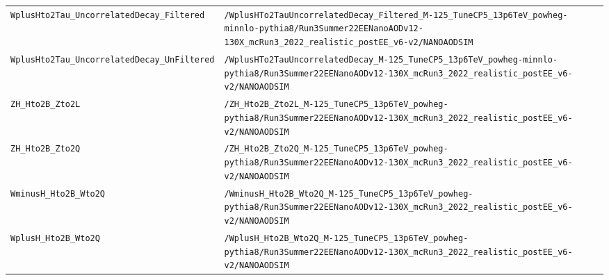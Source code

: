 \begin{longtable}{@{}>{\RaggedRight\arraybackslash}p{} >{\RaggedRight\arraybackslash}p{}@{}}
\texttt{WplusHto2Tau\_\allowbreak{}UncorrelatedDecay\_\allowbreak{}Filtered} & \texttt{/\allowbreak{}WplusHTo2TauUncorrelatedDecay\_\allowbreak{}Filtered\_\allowbreak{}M-\allowbreak{}125\_\allowbreak{}TuneCP5\_\allowbreak{}13p6TeV\_\allowbreak{}powheg-\allowbreak{}minnlo-\allowbreak{}pythia8/\allowbreak{}Run3Summer22EENanoAODv12-\allowbreak{}130X\_\allowbreak{}mcRun3\_\allowbreak{}2022\_\allowbreak{}realistic\_\allowbreak{}postEE\_\allowbreak{}v6-\allowbreak{}v2/\allowbreak{}NANOAODSIM} \\
\addlinespace[2pt]
\texttt{WplusHto2Tau\_\allowbreak{}UncorrelatedDecay\_\allowbreak{}UnFiltered} & \texttt{/\allowbreak{}WplusHTo2TauUncorrelatedDecay\_\allowbreak{}M-\allowbreak{}125\_\allowbreak{}TuneCP5\_\allowbreak{}13p6TeV\_\allowbreak{}powheg-\allowbreak{}minnlo-\allowbreak{}pythia8/\allowbreak{}Run3Summer22EENanoAODv12-\allowbreak{}130X\_\allowbreak{}mcRun3\_\allowbreak{}2022\_\allowbreak{}realistic\_\allowbreak{}postEE\_\allowbreak{}v6-\allowbreak{}v2/\allowbreak{}NANOAODSIM} \\
\addlinespace[2pt]
\texttt{ZH\_\allowbreak{}Hto2B\_\allowbreak{}Zto2L} & \texttt{/\allowbreak{}ZH\_\allowbreak{}Hto2B\_\allowbreak{}Zto2L\_\allowbreak{}M-\allowbreak{}125\_\allowbreak{}TuneCP5\_\allowbreak{}13p6TeV\_\allowbreak{}powheg-\allowbreak{}pythia8/\allowbreak{}Run3Summer22EENanoAODv12-\allowbreak{}130X\_\allowbreak{}mcRun3\_\allowbreak{}2022\_\allowbreak{}realistic\_\allowbreak{}postEE\_\allowbreak{}v6-\allowbreak{}v2/\allowbreak{}NANOAODSIM} \\
\addlinespace[2pt]
\texttt{ZH\_\allowbreak{}Hto2B\_\allowbreak{}Zto2Q} & \texttt{/\allowbreak{}ZH\_\allowbreak{}Hto2B\_\allowbreak{}Zto2Q\_\allowbreak{}M-\allowbreak{}125\_\allowbreak{}TuneCP5\_\allowbreak{}13p6TeV\_\allowbreak{}powheg-\allowbreak{}pythia8/\allowbreak{}Run3Summer22EENanoAODv12-\allowbreak{}130X\_\allowbreak{}mcRun3\_\allowbreak{}2022\_\allowbreak{}realistic\_\allowbreak{}postEE\_\allowbreak{}v6-\allowbreak{}v2/\allowbreak{}NANOAODSIM} \\
\addlinespace[2pt]
\texttt{WminusH\_\allowbreak{}Hto2B\_\allowbreak{}Wto2Q} & \texttt{/\allowbreak{}WminusH\_\allowbreak{}Hto2B\_\allowbreak{}Wto2Q\_\allowbreak{}M-\allowbreak{}125\_\allowbreak{}TuneCP5\_\allowbreak{}13p6TeV\_\allowbreak{}powheg-\allowbreak{}pythia8/\allowbreak{}Run3Summer22EENanoAODv12-\allowbreak{}130X\_\allowbreak{}mcRun3\_\allowbreak{}2022\_\allowbreak{}realistic\_\allowbreak{}postEE\_\allowbreak{}v6-\allowbreak{}v2/\allowbreak{}NANOAODSIM} \\
\addlinespace[2pt]
\texttt{WplusH\_\allowbreak{}Hto2B\_\allowbreak{}Wto2Q} & \texttt{/\allowbreak{}WplusH\_\allowbreak{}Hto2B\_\allowbreak{}Wto2Q\_\allowbreak{}M-\allowbreak{}125\_\allowbreak{}TuneCP5\_\allowbreak{}13p6TeV\_\allowbreak{}powheg-\allowbreak{}pythia8/\allowbreak{}Run3Summer22EENanoAODv12-\allowbreak{}130X\_\allowbreak{}mcRun3\_\allowbreak{}2022\_\allowbreak{}realistic\_\allowbreak{}postEE\_\allowbreak{}v6-\allowbreak{}v2/\allowbreak{}NANOAODSIM} \\

\end{longtable}
